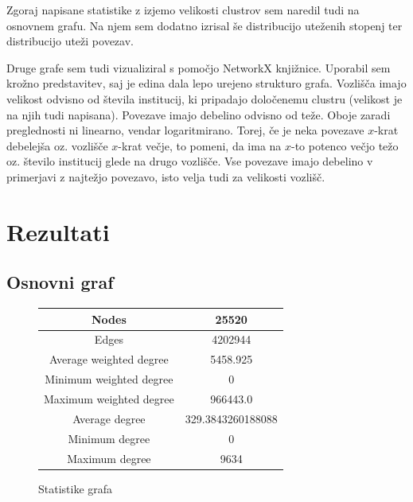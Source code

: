 \documentclass[a4paper,12pt]{article}
\begin{document}
	Zgoraj napisane statistike z izjemo velikosti clustrov sem naredil tudi na osnovnem grafu. Na njem sem dodatno izrisal še distribucijo uteženih stopenj ter distribucijo uteži povezav.
	
	Druge grafe sem tudi vizualiziral s pomočjo NetworkX knjižnice. Uporabil sem krožno predstavitev, saj je edina dala lepo urejeno strukturo grafa. Vozlišča imajo velikost odvisno od števila institucij, ki pripadajo določenemu clustru (velikost je na njih tudi napisana). Povezave imajo debelino odvisno od teže. Oboje zaradi preglednosti ni linearno, vendar logaritmirano. Torej, če je neka povezave $x$-krat debelejša oz. vozlišče $x$-krat večje, to pomeni, da ima na $x$-to potenco večjo težo oz. število institucij glede na drugo vozlišče. Vse povezave imajo debelino v primerjavi z najtežjo povezavo, isto velja tudi za velikosti vozlišč.
	
	\section{Rezultati}
	\subsection{Osnovni graf}
		\begin{figure}[H]
		\centering
		\begin{tabular}{ |c|c| } 
			\hline
			Nodes& 25520 \\
			\hline
			Edges& 4202944 \\
			\hline
			Average weighted degree& 5458.925 \\
			Minimum weighted degree& 0 \\
			Maximum weighted degree& 966443.0 \\
			\hline
			Average degree& 329.3843260188088 \\
			Minimum degree& 0 \\ 
			Maximum degree& 9634 \\
			\hline
		\end{tabular}
		\caption{Statistike grafa}
	\end{figure}
\end{document}
